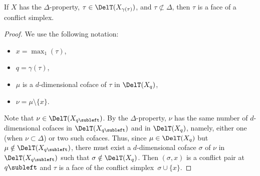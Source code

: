 %
%
\begin{lemma}\label{Lem:Conflict_Technicality_2}
If $X$ has the $\Delta$-property, $\tau\in \DelT(X_{\gamma(\tau)})$, and $\tau\not \subset \Delta$, then $\tau$ is a face of a conflict simplex.
\end{lemma}
%
\begin{proof}
We use the following notation:
\begin{itemize}
\item $x=\max_1(\tau)$, 
\item $q=\gamma(\tau)$, 
\item $\mu$ is a $d$-dimensional coface of $\tau$ in $\DelT(X_{q})$,
\item $\nu=\mu\setminus \{x\}$.  
\end{itemize}
Note that $\nu\in \DelT(X_{q{\subleft}})$.   By the $\Delta$-property, $\nu$ has the same number of $d$-dimensional cofaces in $\DelT(X_{q{\subleft}})$ and in $\DelT(X_{q})$, namely, either one (when $\nu\subset \Delta$) or two such cofaces.  Thus, since $\mu\in \DelT(X_{q})$ but $\mu\notin \DelT(X_{q{\subleft}})$, there must exist a $d$-dimensional coface $\sigma$ of $\nu$ in $\DelT(X_{q{\subleft}})$ such that $\sigma \notin \DelT(X_{q})$.  Then $(\sigma, x)$ is a conflict pair at $q{\subleft}$ and $\tau$ is a face of the conflict simplex~$\sigma\cup\{x\}$.   
\end{proof}
%
%
